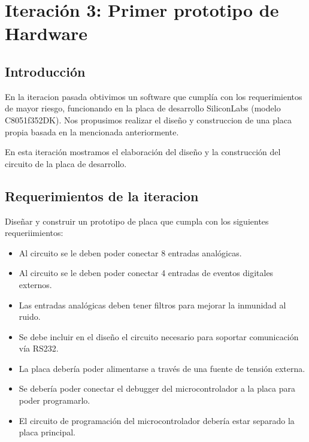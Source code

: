 \chapter{Iteración 3: Primer prototipo de Hardware} %
\label{cha:iteracion_3}


\section{Introducción} %
\label{it3:sec:introduccion}

En la iteracion pasada obtivimos un software que cumplía con los requerimientos de mayor riesgo, funcionando en la placa de desarrollo SiliconLabs (modelo C8051f352DK). Nos propusimos realizar el diseño y construccion de una placa propia basada en la mencionada anteriormente.

En esta iteración mostramos el elaboración del diseño y la construcción del circuito de la placa de desarrollo.




\section{Requerimientos de la iteracion} %
\label{it3:sec:requerimientos_de_la_iteracion}

Diseñar y construir un prototipo de placa que cumpla con los siguientes requeriimientos:

\begin{itemize}
\item Al circuito se le deben poder conectar 8 entradas analógicas.
\item Al circuito se le deben poder conectar 4 entradas de eventos digitales externos.
\item Las entradas analógicas deben tener filtros para mejorar la inmunidad al ruido.
\item Se debe incluir en el diseño el circuito necesario para soportar comunicación vía RS232.
\item La placa debería poder alimentarse a través de una fuente de tensión externa.
\item Se debería poder conectar el debugger del microcontrolador a la placa para poder programarlo.
\item El circuito de programación del microcontrolador debería estar separado la placa principal.
\end{itemize}


